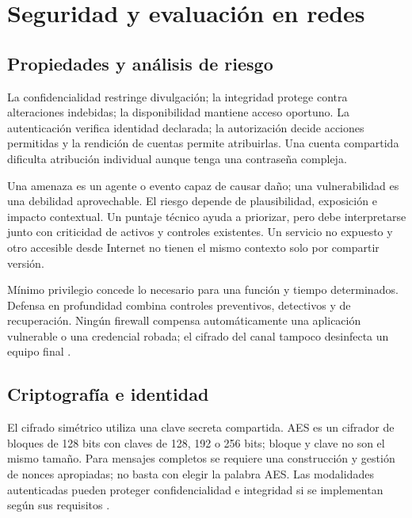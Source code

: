 
\section{Seguridad y evaluación en redes}\label{sec:r3}
\subsection{Propiedades y análisis de riesgo}
La confidencialidad restringe divulgación; la integridad protege contra alteraciones indebidas; la disponibilidad mantiene acceso oportuno. La autenticación verifica identidad declarada; la autorización decide acciones permitidas y la rendición de cuentas permite atribuirlas. Una cuenta compartida dificulta atribución individual aunque tenga una contraseña compleja.

Una amenaza es un agente o evento capaz de causar daño; una vulnerabilidad es una debilidad aprovechable. El riesgo depende de plausibilidad, exposición e impacto contextual. Un puntaje técnico ayuda a priorizar, pero debe interpretarse junto con criticidad de activos y controles existentes. Un servicio no expuesto y otro accesible desde Internet no tienen el mismo contexto solo por compartir versión.

Mínimo privilegio concede lo necesario para una función y tiempo determinados. Defensa en profundidad combina controles preventivos, detectivos y de recuperación. Ningún firewall compensa automáticamente una aplicación vulnerable o una credencial robada; el cifrado del canal tampoco desinfecta un equipo final \cite[familias AC, IA, AU, SC y SI]{nistsecurity}.

\subsection{Criptografía e identidad}
El cifrado simétrico utiliza una clave secreta compartida. AES es un cifrador de bloques de 128 bits con claves de 128, 192 o 256 bits; bloque y clave no son el mismo tamaño. Para mensajes completos se requiere una construcción y gestión de nonces apropiadas; no basta con elegir la palabra AES. Las modalidades autenticadas pueden proteger confidencialidad e integridad si se implementan según sus requisitos \cite[secciones 1--5]{aes}.

